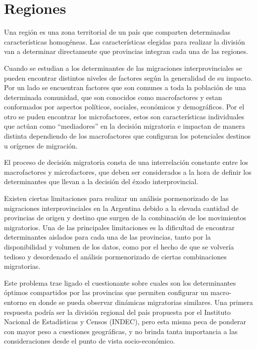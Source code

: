 \documentclass[12pt,a4paper]{article}
\begin{document}
\section{Regiones}

Una región es una zona territorial de un país que comparten determinadas características homogéneas. Las características elegidas para realizar la división van a determinar directamente que provincias integran cada una de las regiones.

Cuando se estudian a los determinantes de las migraciones interprovinciales se pueden encontrar distintos niveles de factores según la generalidad de su impacto. Por un lado se encuentran factores que son comunes a toda la población de una determinada comunidad, que son conocidos como macrofactores y estan conformados por aspectos políticos, sociales, económicos y demográficos. Por el otro se puden encontrar los microfactores, estos son características individuales que actúan como “mediadores” en la decisión migratoria e impactan de manera distinta dependiendo de los macrofactores que configuran los potenciales destinos u orígenes de migración.

El proceso de decisión migratoria consta de una interrelación constante entre los macrofactores y microfactores, que deben ser considerados a la hora de definir los determinantes que llevan a la decisión del éxodo interprovincial.

Existen ciertas limitaciones para realizar un análisis pormenorizado de las migraciones interprovinciales en la Argentina debido a la elevada cantidad de provincias de origen y destino que surgen de la combinación de los movimientos migratorios. Una de las principales limitaciones es la dificultad de encontrar determinantes aislados para cada una de las provincias, tanto por la disponibilidad y volumen de los datos, como por el hecho de que se volvería tedioso y desordenado el análisis pormenorizado de ciertas combinaciones migratorias.

Este problema trae ligado el cuestionante sobre cuales son los  determinantes óptimos compartidos por las  provincias  que permiten configurar un macro-entorno en donde se pueda  observar dinámicas migratorias similares. Una primera respuesta podría ser la  división regional del país propuesta por el Instituto Nacional de Estadísticas y Censos (INDEC), pero esta misma peca de ponderar con mayor peso a cuestiones geográficas, y no brinda tanta importancia a las consideraciones desde el punto de vista socio-económico.
 
\end{document}
